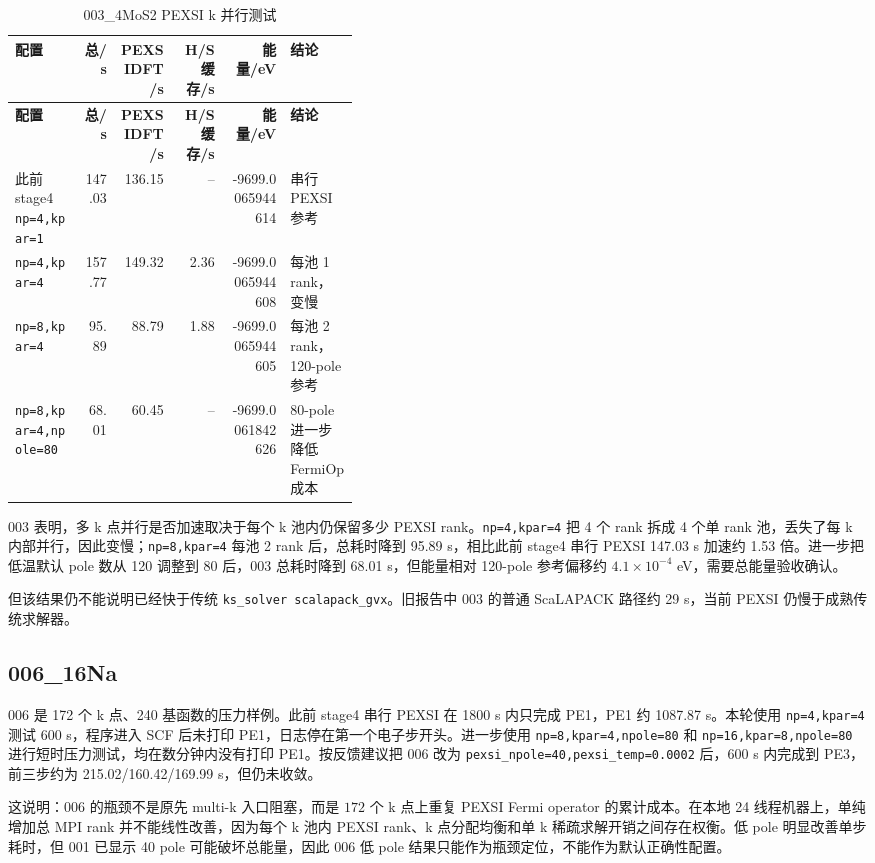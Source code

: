 \documentclass[a4paper,11pt]{article}
\newcommand{\code}[1]{\texttt{#1}}
\begin{document}
\begin{longtable}{@{}p{0.20\linewidth}r r r r p{0.20\linewidth}@{}}
\caption{003\_4MoS2 PEXSI k 并行测试}
\label{tab:case003}\\
\toprule
\textbf{配置} & \textbf{总/s} & \textbf{PEXSIDFT/s} & \textbf{H/S 缓存/s} & \textbf{能量/eV} & \textbf{结论}\\
\midrule
\endfirsthead
\toprule
\textbf{配置} & \textbf{总/s} & \textbf{PEXSIDFT/s} & \textbf{H/S 缓存/s} & \textbf{能量/eV} & \textbf{结论}\\
\midrule
\endhead
此前 stage4 \code{np=4,kpar=1} & 147.03 & 136.15 & -- & -9699.0065944614 & 串行 PEXSI 参考\\
\code{np=4,kpar=4} & 157.77 & 149.32 & 2.36 & -9699.0065944608 & 每池 1 rank，变慢\\
\code{np=8,kpar=4} & 95.89 & 88.79 & 1.88 & -9699.0065944605 & 每池 2 rank，120-pole 参考\\
\code{np=8,kpar=4,npole=80} & 68.01 & 60.45 & -- & -9699.0061842626 & 80-pole 进一步降低 FermiOp 成本\\
\bottomrule
\end{longtable}

003 表明，多 k 点并行是否加速取决于每个 k 池内仍保留多少 PEXSI rank。\code{np=4,kpar=4} 把 4 个 rank 拆成 4 个单 rank 池，丢失了每 k 内部并行，因此变慢；\code{np=8,kpar=4} 每池 2 rank 后，总耗时降到 95.89 s，相比此前 stage4 串行 PEXSI 147.03 s 加速约 1.53 倍。进一步把低温默认 pole 数从 120 调整到 80 后，003 总耗时降到 68.01 s，但能量相对 120-pole 参考偏移约 \(4.1\times10^{-4}\) eV，需要总能量验收确认。

但该结果仍不能说明已经快于传统 \code{ks\_solver scalapack\_gvx}。旧报告中 003 的普通 ScaLAPACK 路径约 29 s，当前 PEXSI 仍慢于成熟传统求解器。

\subsection{006\_16Na}

006 是 172 个 k 点、240 基函数的压力样例。此前 stage4 串行 PEXSI 在 1800 s 内只完成 PE1，PE1 约 1087.87 s。本轮使用 \code{np=4,kpar=4} 测试 600 s，程序进入 SCF 后未打印 PE1，日志停在第一个电子步开头。进一步使用 \code{np=8,kpar=4,npole=80} 和 \code{np=16,kpar=8,npole=80} 进行短时压力测试，均在数分钟内没有打印 PE1。按反馈建议把 006 改为 \code{pexsi\_npole=40,pexsi\_temp=0.0002} 后，600 s 内完成到 PE3，前三步约为 215.02/160.42/169.99 s，但仍未收敛。

这说明：006 的瓶颈不是原先 multi-k 入口阻塞，而是 \(172\) 个 k 点上重复 PEXSI Fermi operator 的累计成本。在本地 24 线程机器上，单纯增加总 MPI rank 并不能线性改善，因为每个 k 池内 PEXSI rank、k 点分配均衡和单 k 稀疏求解开销之间存在权衡。低 pole 明显改善单步耗时，但 001 已显示 40 pole 可能破坏总能量，因此 006 低 pole 结果只能作为瓶颈定位，不能作为默认正确性配置。
\end{document}
